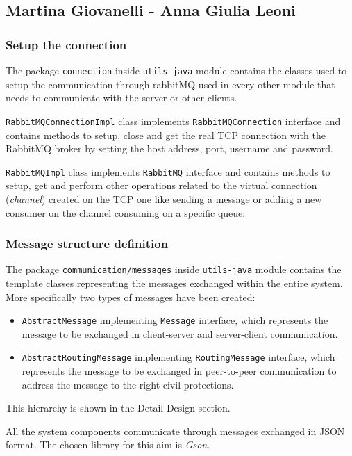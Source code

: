 \documentclass[a4paper,12pt]{report}
\begin{document}
\subsection{Martina Giovanelli - Anna Giulia Leoni}

\subsubsection{Setup the connection}
The package \texttt{connection} inside \texttt{utils-java} module contains the classes used to setup the communication through rabbitMQ used in every other module that needs to communicate with the server or other clients.

\texttt{RabbitMQConnectionImpl} class implements \texttt{RabbitMQConnection} interface and contains methods to setup, close and get the real TCP connection with the RabbitMQ broker by setting the host address, port, username and password. 

\texttt{RabbitMQImpl} class implements \texttt{RabbitMQ} interface and contains methods to setup, get and perform other operations related to the virtual connection (\textit{channel}) created on the TCP one like sending a message or adding a new consumer on the channel consuming on a specific queue.

\subsubsection{Message structure definition}
The package \texttt{communication/messages} inside \texttt{utils-java} module contains the template classes representing the messages exchanged within the entire system.
More specifically two types of messages have been created:
\begin{itemize}
\item \texttt{AbstractMessage} implementing \texttt{Message} interface, which represents the message to be exchanged in client-server and server-client communication. 
\item \texttt{AbstractRoutingMessage} implementing \texttt{RoutingMessage} interface, which represents the message to be exchanged in peer-to-peer communication to address the message to the right civil protections. 
\end{itemize}
This hierarchy is shown in the Detail Design section.

All the system components communicate through messages exchanged in JSON format. The chosen library for this aim is \textit{Gson}. 
\end{document}

